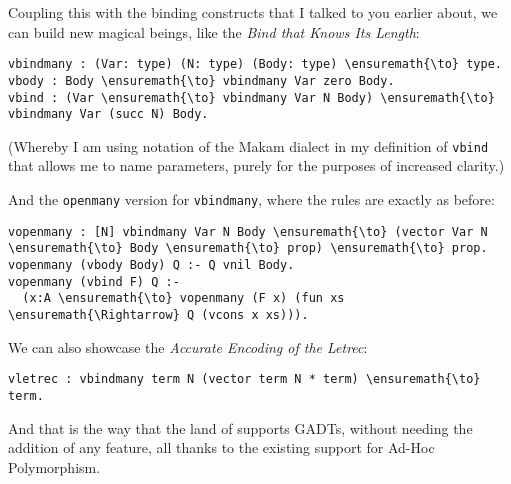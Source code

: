 Coupling this with the binding constructs that I talked to you earlier
about, we can build new magical beings, like the \emph{Bind that Knows
Its Length}:

\begin{verbatim}
vbindmany : (Var: type) (N: type) (Body: type) \ensuremath{\to} type.
vbody : Body \ensuremath{\to} vbindmany Var zero Body.
vbind : (Var \ensuremath{\to} vbindmany Var N Body) \ensuremath{\to} vbindmany Var (succ N) Body.
\end{verbatim}

(Whereby I am using notation of the Makam dialect in my definition of
\texttt{vbind} that allows me to name parameters, purely for the
purposes of increased clarity.)

And the \texttt{openmany} version for \texttt{vbindmany}, where the
rules are exactly as before:

\begin{verbatim}
vopenmany : [N] vbindmany Var N Body \ensuremath{\to} (vector Var N \ensuremath{\to} Body \ensuremath{\to} prop) \ensuremath{\to} prop.
vopenmany (vbody Body) Q :- Q vnil Body.
vopenmany (vbind F) Q :-
  (x:A \ensuremath{\to} vopenmany (F x) (fun xs \ensuremath{\Rightarrow} Q (vcons x xs))).
\end{verbatim}

We can also showcase the \emph{Accurate Encoding of the Letrec}:

\begin{verbatim}
vletrec : vbindmany term N (vector term N * term) \ensuremath{\to} term.
\end{verbatim}

And that is the way that the land of \lamprolog supports GADTs, without
needing the addition of any feature, all thanks to the existing support
for Ad-Hoc Polymorphism.

\identDialog

\heroNEEDFEEDBACK{}
